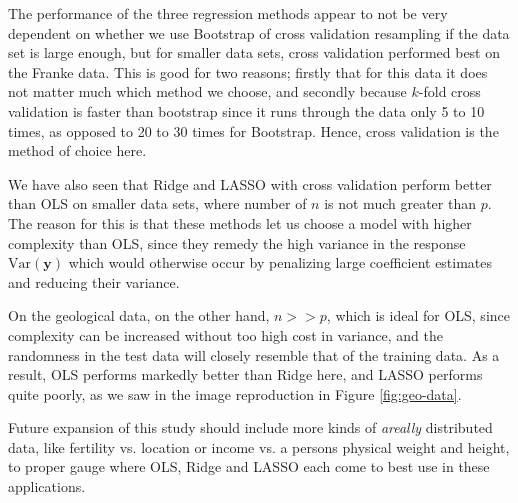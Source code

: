 \documentclass[]{article}
\begin{document}
The performance of the three regression methods appear to not be very dependent on whether we use Bootstrap of cross validation resampling if the data set is large enough, but for smaller data sets, cross validation performed best on the Franke data. This is good for two reasons; firstly that for this data it does not matter much which method we choose, and secondly because $k$-fold cross validation is faster than bootstrap since it runs through the data only 5 to 10 times, as opposed to 20 to 30 times for Bootstrap. Hence, cross validation is the method of choice here.

We have also seen that Ridge and LASSO with cross validation perform better than OLS on smaller data sets, where number of $n$ is not much greater than $p$. The reason for this is that these methods let us choose a model with higher complexity than OLS, since they remedy the high variance in the response $\mathrm{Var}(\mathbf{y})$ which would otherwise occur by penalizing large coefficient estimates and reducing their variance.

On the geological data, on the other hand, $n >> p$, which is ideal for OLS, since complexity can be increased without too high cost in variance, and the randomness in the test data will closely resemble that of the training data. As a result, OLS performs markedly better than Ridge here, and LASSO performs quite poorly, as we saw in the image reproduction in Figure \ref{fig:geo-data}.

Future expansion of this study should include more kinds of \textit{areally} distributed data, like fertility vs. location or income vs. a persons physical weight and height, to proper gauge where OLS, Ridge and LASSO each come to best use in these applications.

\clearpage


\end{document}
